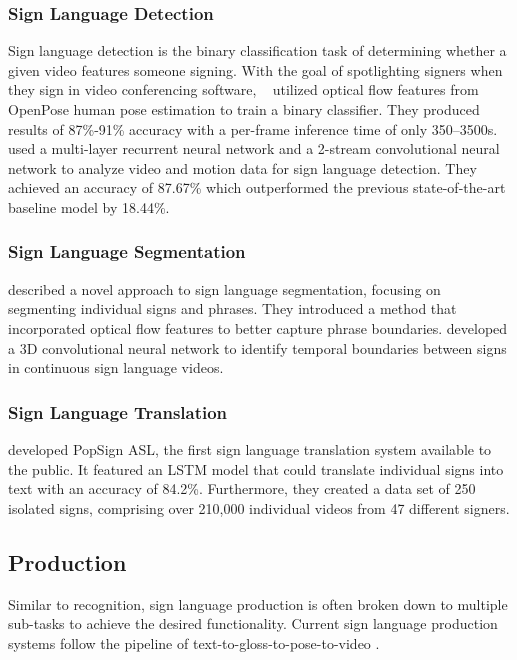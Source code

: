 \documentclass[../paper.tex]{subfiles}
\begin{document}
\subsubsection*{Sign Language Detection}
Sign language detection is the binary classification task of determining whether a given video features someone signing. With the goal of spotlighting signers when they sign in video conferencing software, \ \citet{SignLanguageDetection} utilized optical flow features from OpenPose human pose estimation to train a binary classifier. They produced results of 87\%-91\% accuracy with a per-frame inference time of only 350–3500\textit{\textmu}s. \citet{SignLanguageDetectionInTheWild} used a multi-layer recurrent neural network and a 2-stream convolutional neural network to analyze video and motion data for sign language detection. They achieved an accuracy of 87.67\% which outperformed the previous state-of-the-art baseline model by 18.44\%.

\subsubsection*{Sign Language Segmentation}
\citet{SignLanguageSegmentation} described a novel approach to sign language segmentation, focusing on segmenting individual signs and phrases. They introduced a method that incorporated optical flow features to better capture phrase boundaries. \citet{TemporalSignLanguageSegmentation} developed a 3D convolutional neural network to identify temporal boundaries between signs in continuous sign language videos.

\subsubsection*{Sign Language Translation}
\citet{PopSign} developed PopSign ASL, the first sign language translation system available to the public. It featured an LSTM model that could translate individual signs into text with an accuracy of 84.2\%. Furthermore, they created a data set of 250 isolated signs, comprising over 210,000 individual videos from 47 different signers.


\subsection{Production}
Similar to recognition, sign language production is often broken down to multiple sub-tasks to achieve the desired functionality. Current sign language production systems follow the pipeline of text-to-gloss-to-pose-to-video \cite{SLP}. 
\end{document}
